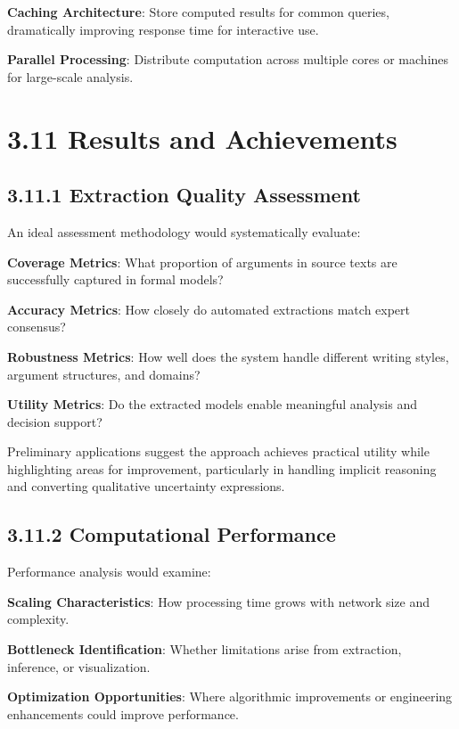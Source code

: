 \documentclass[
  11pt,
  letterpaper,
]{book}
\begin{document}
\textbf{Caching Architecture}: Store computed results for common
queries, dramatically improving response time for interactive use.

\textbf{Parallel Processing}: Distribute computation across multiple
cores or machines for large-scale analysis.

\section{3.11 Results and Achievements}\label{sec-results-achievements}

\subsection{3.11.1 Extraction Quality
Assessment}\label{sec-extraction-quality}

An ideal assessment methodology would systematically evaluate:

\textbf{Coverage Metrics}: What proportion of arguments in source texts
are successfully captured in formal models?

\textbf{Accuracy Metrics}: How closely do automated extractions match
expert consensus?

\textbf{Robustness Metrics}: How well does the system handle different
writing styles, argument structures, and domains?

\textbf{Utility Metrics}: Do the extracted models enable meaningful
analysis and decision support?

Preliminary applications suggest the approach achieves practical utility
while highlighting areas for improvement, particularly in handling
implicit reasoning and converting qualitative uncertainty expressions.

\subsection{3.11.2 Computational
Performance}\label{sec-computational-performance}

Performance analysis would examine:

\textbf{Scaling Characteristics}: How processing time grows with network
size and complexity.

\textbf{Bottleneck Identification}: Whether limitations arise from
extraction, inference, or visualization.

\textbf{Optimization Opportunities}: Where algorithmic improvements or
engineering enhancements could improve performance.
\end{document}
